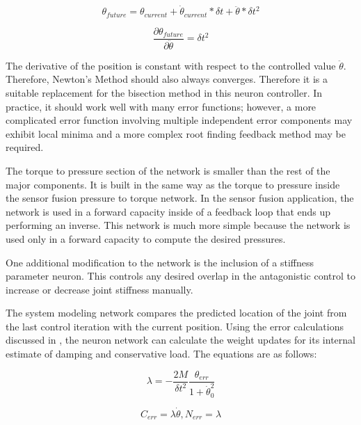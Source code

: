 \begin{equation}
\theta_{future} = \theta_{current} + \dot{\theta}_{current} * \delta t + \ddot{\theta} * \delta t^{2}
\end{equation}

\begin{equation}
\dfrac{\partial \theta_{future}}{\partial \ddot{\theta}} = \delta t^{2}
\end{equation}

The derivative of the position is constant with respect to the controlled value
$\ddot{\theta}$. Therefore, Newton's Method should also always converges.
Therefore it is a suitable replacement for the bisection method in this neuron
controller. In practice, it should work well with many error functions; however,
a more complicated error function involving multiple independent error 
components may exhibit local minima and a more complex root finding feedback
method may be required.


The torque to pressure section of the network is smaller than the rest of the 
major components. It is built in the same way as the torque to pressure inside
the sensor fusion pressure to torque network. In the sensor fusion application,
the network is used in a forward capacity inside of a feedback loop that ends
up performing an inverse. This network is much more simple because the network
is used only in a forward capacity to compute the desired pressures.

One additional modification to the network is the inclusion of a stiffness
parameter neuron. This controls any desired overlap in the antagonistic control
to increase or decrease joint stiffness manually.


The system modeling network compares the predicted location of the joint from 
the last control iteration with the current position. Using the error 
calculations discussed in , the neuron network
can calculate the weight updates for its internal estimate of damping and 
conservative load. The equations are as follows:

\begin{equation}
\lambda 
=
- \dfrac{2M}{\delta t^{2}} \dfrac{\theta_{err}}{1 + \dot{\theta}_{0}^{2}}
\end{equation}

\begin{equation}
C_{err} = \lambda \dot{\theta}, N_{err} = \lambda
\end{equation}

